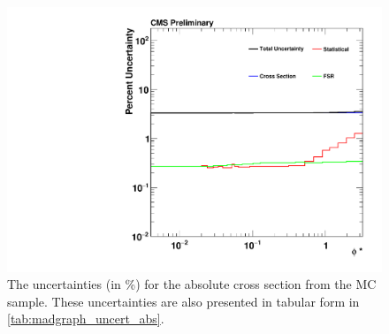 \begin{figure}[!p]
    \centering
    \includegraphics[width=\textwidth]{figures/madgraph_uncertainty_absolute.pdf}
    \caption[
        The uncertainties for the absolute cross section from the \MADGRAPH MC
        sample.
    ]{
        The uncertainties (in \%) for the absolute cross section from the
        \MADGRAPH MC sample. These uncertainties are also presented in tabular
        form in \cref{tab:madgraph_uncert_abs}.
    }
    \label{fig:madgraph_uncert_abs}
\end{figure}

